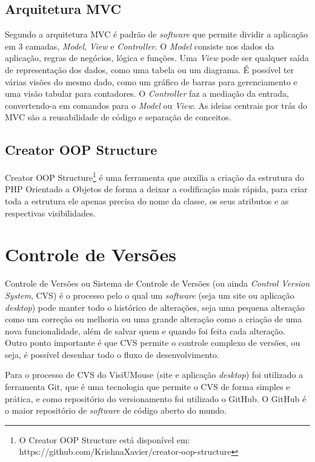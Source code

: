 \subsection{Arquitetura MVC}

Segundo  a arquitetura MVC é padrão de \textit{software} que permite dividir a aplicação em 3 camadas, \textit{Model}, \textit{View} e \textit{Controller}. O \textit{Model} consiste nos dados da aplicação, regras de negócios, lógica e funções. Uma \textit{View} pode ser qualquer saída de representação dos dados, como uma tabela ou um diagrama. É possível ter várias visões do mesmo dado, como um gráfico de barras para gerenciamento e uma visão tabular para contadores. O \textit{Controller} faz a mediação da entrada, convertendo-a em comandos para o \textit{Model} ou \textit{View}. As ideias centrais por trás do MVC são a reusabilidade de código e separação de conceitos.

\subsection{Creator OOP Structure}

Creator OOP Structure\footnote{O Creator OOP Structure está disponível em: https://github.com/KrishnaXavier/creator-oop-structure}  é uma ferramenta que auxilia a criação da estrutura do PHP Orientado a Objetos de forma a deixar a codificação mais rápida, para criar toda a estrutura ele apenas precisa do nome da classe, os seus atributos e as respectivas visibilidades.

\section{Controle de Versões}
Controle de Versões ou Sistema de Controle de Versões (ou ainda \textit{Control Version System}, {CVS}) é o processo pelo o qual um \textit{software} (seja um site ou aplicação \textit{desktop}) pode manter todo o histórico de alterações, seja uma pequena alteração como um correção ou melhoria ou uma grande alteração como a criação de uma nova funcionalidade, além de salvar quem e quando foi feita cada alteração. Outro ponto importante é que CVS permite o controle complexo de versões, ou seja, é possível desenhar todo o fluxo de desenvolvimento. 

Para o processo de CVS do VisiUMouse (site e aplicação \textit{desktop}) foi utilizado a ferramenta Git, que é uma tecnologia que permite o CVS de forma simples e prática, e como repositório do versionamento foi utilizado o GitHub. O GitHub é o maior repositório de \textit{software} de código aberto do mundo.



